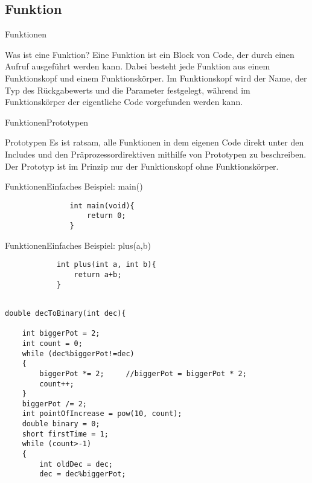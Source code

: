 \documentclass[usenames,dvipsnames,10pt]{beamer}
\begin{document}
    \subsection{Funktion}
    \begin{frame}{Funktionen}
        \begin{block}{Was ist eine Funktion?}
            Eine Funktion ist ein Block von Code, der durch einen Aufruf ausgeführt werden kann. Dabei besteht jede Funktion aus einem 
            Funktionskopf und einem Funktionskörper. Im Funktionskopf wird der Name, der Typ des Rückgabewerts und die Parameter festgelegt, während
            im Funktionskörper der eigentliche Code vorgefunden werden kann.
        \end{block}
    \end{frame}
    \begin{frame}{Funktionen}{Prototypen}
        \begin{block}{Prototypen}
            Es ist ratsam, alle Funktionen in dem eigenen Code direkt unter den Includes und den Präprozessordirektiven mithilfe von Prototypen
            zu beschreiben. Der Prototyp ist im Prinzip nur der Funktionskopf ohne Funktionskörper.
        \end{block}
    \end{frame}
    \begin{frame}[fragile]{Funktionen}{Einfaches Beispiel: main()}
           \begin{lstlisting}
               int main(void){
                   return 0; 
               }
           \end{lstlisting} 
    \end{frame}
    \begin{frame}[fragile]{Funktionen}{Einfaches Beispiel: plus(a,b)}
        \begin{lstlisting}
            int plus(int a, int b){
                return a+b;
            }
        \end{lstlisting}
    \end{frame}
    \begin{frame}[fragile]
        \begin{lstlisting}
            
double decToBinary(int dec){

    int biggerPot = 2;
    int count = 0;
    while (dec%biggerPot!=dec)
    {
        biggerPot *= 2;     //biggerPot = biggerPot * 2;
        count++;
    }
    biggerPot /= 2;
    int pointOfIncrease = pow(10, count);
    double binary = 0;
    short firstTime = 1;
    while (count>-1)
    {
        int oldDec = dec;
        dec = dec%biggerPot;

    \end{lstlisting}
    \end{frame}
\end{document}
